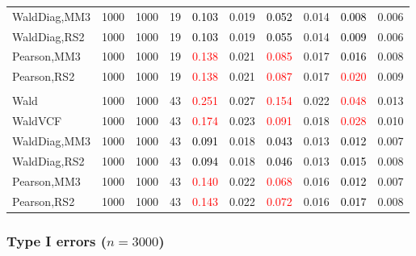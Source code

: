 \documentclass[
]{article}
\begin{document}
\begin{table}[H]
{\begin{tabular}[t]{lrrrrrrlrr}
\hspace{1em}WaldDiag,MM3 & 1000 & 1000 & 19 & \textcolor{black}{0.103} & 0.019 & \textcolor{black}{0.052} & 0.014 & \textcolor{black}{0.008} & 0.006\\
\hspace{1em}WaldDiag,RS2 & 1000 & 1000 & 19 & \textcolor{black}{0.103} & 0.019 & \textcolor{black}{0.055} & 0.014 & \textcolor{black}{0.009} & 0.006\\
\hspace{1em}Pearson,MM3 & 1000 & 1000 & 19 & \textcolor{red}{0.138} & 0.021 & \textcolor{red}{0.085} & 0.017 & \textcolor{black}{0.016} & 0.008\\
\hspace{1em}Pearson,RS2 & 1000 & 1000 & 19 & \textcolor{red}{0.138} & 0.021 & \textcolor{red}{0.087} & 0.017 & \textcolor{red}{0.020} & 0.009\\
\addlinespace[0.3em]
\multicolumn{10}{l}{\textbf{3F 15V}}\\
\hspace{1em}Wald & 1000 & 1000 & 43 & \textcolor{red}{0.251} & 0.027 & \textcolor{red}{0.154} & 0.022 & \textcolor{red}{0.048} & 0.013\\
\hspace{1em}WaldVCF & 1000 & 1000 & 43 & \textcolor{red}{0.174} & 0.023 & \textcolor{red}{0.091} & 0.018 & \textcolor{red}{0.028} & 0.010\\
\hspace{1em}WaldDiag,MM3 & 1000 & 1000 & 43 & \textcolor{black}{0.091} & 0.018 & \textcolor{black}{0.043} & 0.013 & \textcolor{black}{0.012} & 0.007\\
\hspace{1em}WaldDiag,RS2 & 1000 & 1000 & 43 & \textcolor{black}{0.094} & 0.018 & \textcolor{black}{0.046} & 0.013 & \textcolor{black}{0.015} & 0.008\\
\hspace{1em}Pearson,MM3 & 1000 & 1000 & 43 & \textcolor{red}{0.140} & 0.022 & \textcolor{red}{0.068} & 0.016 & \textcolor{black}{0.012} & 0.007\\
\hspace{1em}Pearson,RS2 & 1000 & 1000 & 43 & \textcolor{red}{0.143} & 0.022 & \textcolor{red}{0.072} & 0.016 & \textcolor{black}{0.017} & 0.008\\
\bottomrule
\end{tabular}}
\endgroup{}
\end{table}

\hypertarget{type-i-errors-n3000-3}{%
\subsubsection{\texorpdfstring{Type I errors
(\(n=3000\))}{Type I errors (n=3000)}}\label{type-i-errors-n3000-3}}
\end{document}
